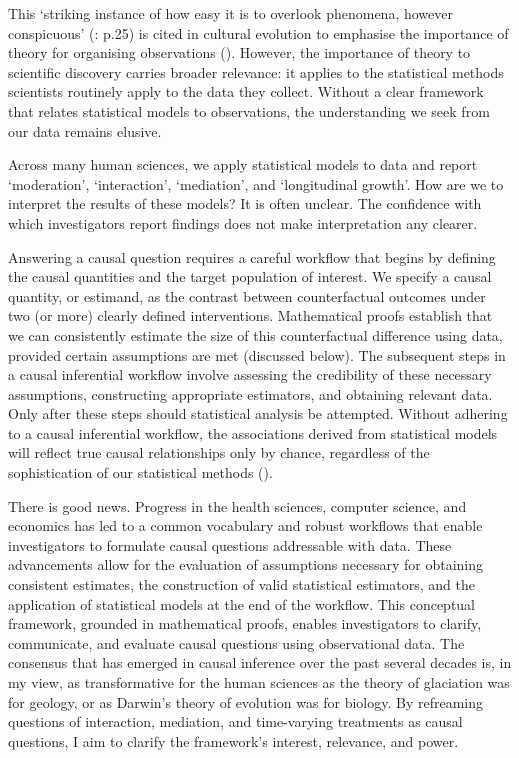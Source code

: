 \documentclass[
  single column]{article}
\begin{document}
This `striking instance of how easy it is to overlook phenomena, however
conspicuous' (: p.25) is
cited in cultural evolution to emphasise the importance of theory for
organising observations (). However, the importance of theory to scientific discovery
carries broader relevance: it applies to the statistical methods
scientists routinely apply to the data they collect. Without a clear
framework that relates statistical models to observations, the
understanding we seek from our data remains elusive.

Across many human sciences, we apply statistical models to data and
report `moderation', `interaction', `mediation', and `longitudinal
growth'. How are we to interpret the results of these models? It is
often unclear. The confidence with which investigators report findings
does not make interpretation any clearer.

Answering a causal question requires a careful workflow that begins by
defining the causal quantities and the target population of interest. We
specify a causal quantity, or estimand, as the contrast between
counterfactual outcomes under two (or more) clearly defined
interventions. Mathematical proofs establish that we can consistently
estimate the size of this counterfactual difference using data, provided
certain assumptions are met (discussed below). The subsequent steps in a
causal inferential workflow involve assessing the credibility of these
necessary assumptions, constructing appropriate estimators, and
obtaining relevant data. Only after these steps should statistical
analysis be attempted. Without adhering to a causal inferential
workflow, the associations derived from statistical models will reflect
true causal relationships only by chance, regardless of the
sophistication of our statistical methods
().

There is good news. Progress in the health sciences, computer science,
and economics has led to a common vocabulary and robust workflows that
enable investigators to formulate causal questions addressable with
data. These advancements allow for the evaluation of assumptions
necessary for obtaining consistent estimates, the construction of valid
statistical estimators, and the application of statistical models at the
end of the workflow. This conceptual framework, grounded in mathematical
proofs, enables investigators to clarify, communicate, and evaluate
causal questions using observational data. The consensus that has
emerged in causal inference over the past several decades is, in my
view, as transformative for the human sciences as the theory of
glaciation was for geology, or as Darwin's theory of evolution was for
biology. By refreaming questions of interaction, mediation, and
time-varying treatments as causal questions, I aim to clarify the
framework's interest, relevance, and power.
\end{document}
